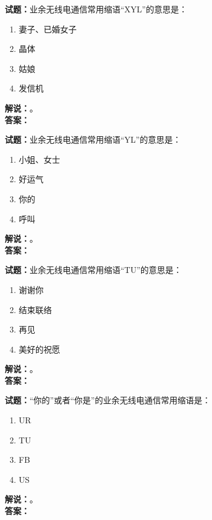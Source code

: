 \documentclass{ctexbook}
\begin{document}
\vspace{\baselineskip}

\noindent\textbf{试题：}业余无线电通信常用缩语“XYL”的意思是：
\begin{enumerate}[leftmargin=3em]
  \item 妻子、已婚女子
  \item 晶体
  \item 姑娘
  \item 发信机
\end{enumerate}
\noindent\textbf{解说：}\textbf{}。\\\noindent\textbf{答案：}

\vspace{\baselineskip}

\noindent\textbf{试题：}业余无线电通信常用缩语“YL”的意思是：
\begin{enumerate}[leftmargin=3em]
  \item 小姐、女士
  \item 好运气
  \item 你的
  \item 呼叫
\end{enumerate}
\noindent\textbf{解说：}\textbf{}。\\\noindent\textbf{答案：}

\vspace{\baselineskip}

\noindent\textbf{试题：}业余无线电通信常用缩语“TU”的意思是：
\begin{enumerate}[leftmargin=3em]
  \item 谢谢你
  \item 结束联络
  \item 再见
  \item 美好的祝愿
\end{enumerate}
\noindent\textbf{解说：}\textbf{}。\\\noindent\textbf{答案：}

\vspace{\baselineskip}

\noindent\textbf{试题：}“你的”或者“你是”的业余无线电通信常用缩语是：
\begin{enumerate}[leftmargin=3em]
  \item UR
  \item TU
  \item FB
  \item US
\end{enumerate}
\noindent\textbf{解说：}\textbf{}。\\\noindent\textbf{答案：}
\end{document}
